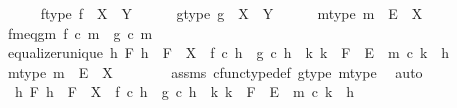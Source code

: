 \begin{isabellebody}
\ \ \ \ \isamarkupfalse%
\ f{\isacharunderscore}{\kern0pt}type{}{\isacharcolon}{\kern0pt}\ {\isachardoublequoteopen}f\ {\isacharcolon}{\kern0pt}\ X{\isacharprime}{\kern0pt}\ {\isasymrightarrow}\ Y{\isacharprime}{\kern0pt}{\isachardoublequoteclose}\isanewline
\ \ \ \ \isamarkupfalse%
\ g{\isacharunderscore}{\kern0pt}type{}{\isacharcolon}{\kern0pt}\ {\isachardoublequoteopen}g\ {\isacharcolon}{\kern0pt}\ X{\isacharprime}{\kern0pt}\ {\isasymrightarrow}\ Y{\isacharprime}{\kern0pt}{\isachardoublequoteclose}\isanewline
\ \ \ \ \isamarkupfalse%
\ m{\isacharunderscore}{\kern0pt}type{\isacharcolon}{\kern0pt}\ {\isachardoublequoteopen}m\ {\isacharcolon}{\kern0pt}\ E\ {\isasymrightarrow}\ X{\isacharprime}{\kern0pt}{\isachardoublequoteclose}\isanewline
\ \ \ \ \isamarkupfalse%
\ fm{\isacharunderscore}{\kern0pt}eq{\isacharunderscore}{\kern0pt}gm{\isacharcolon}{\kern0pt}\ {\isachardoublequoteopen}f\ {\isasymcirc}\isactrlsub c\ m\ {\isacharequal}{\kern0pt}\ g\ {\isasymcirc}\isactrlsub c\ m{\isachardoublequoteclose}\isanewline
\ \ \ \ \isamarkupfalse%
\ equalizer{\isacharunderscore}{\kern0pt}unique{\isacharcolon}{\kern0pt}\ {\isachardoublequoteopen}{\isasymforall}h\ F{\isachardot}{\kern0pt}\ h\ {\isacharcolon}{\kern0pt}\ F\ {\isasymrightarrow}\ X{\isacharprime}{\kern0pt}\ {\isasymand}\ f\ {\isasymcirc}\isactrlsub c\ h\ {\isacharequal}{\kern0pt}\ g\ {\isasymcirc}\isactrlsub c\ h\ {\isasymlongrightarrow}\ {\isacharparenleft}{\kern0pt}{\isasymexists}{\isacharbang}{\kern0pt}k{\isachardot}{\kern0pt}\ k\ {\isacharcolon}{\kern0pt}\ F\ {\isasymrightarrow}\ E\ {\isasymand}\ m\ {\isasymcirc}\isactrlsub c\ k\ {\isacharequal}{\kern0pt}\ h{\isacharparenright}{\kern0pt}{\isachardoublequoteclose}\isanewline
\isanewline
\ \ \ \ \isamarkupfalse%
\ m{\isacharunderscore}{\kern0pt}type{}{\isacharcolon}{\kern0pt}\ {\isachardoublequoteopen}m\ {\isacharcolon}{\kern0pt}\ E\ {\isasymrightarrow}\ X{\isachardoublequoteclose}\isanewline
\ \ \ \ \ \ \isamarkupfalse%
\ assms{\isacharparenleft}{\kern0pt}{}{\isacharparenright}{\kern0pt}\ cfunc{\isacharunderscore}{\kern0pt}type{\isacharunderscore}{\kern0pt}def\ g{\isacharunderscore}{\kern0pt}type{}\ m{\isacharunderscore}{\kern0pt}type\ \isamarkupfalse%
\ auto\isanewline
\isanewline
\ \ \ \ \isamarkupfalse%
\ {\isachardoublequoteopen}{\isasymAnd}\ h\ F{\isachardot}{\kern0pt}\ h\ {\isacharcolon}{\kern0pt}\ F\ {\isasymrightarrow}\ X\ {\isasymLongrightarrow}\ f\ {\isasymcirc}\isactrlsub c\ h\ {\isacharequal}{\kern0pt}\ g\ {\isasymcirc}\isactrlsub c\ h\ {\isasymLongrightarrow}\ {\isasymexists}k{\isachardot}{\kern0pt}\ k\ {\isacharcolon}{\kern0pt}\ F\ {\isasymrightarrow}\ E\ {\isasymand}\ m\ {\isasymcirc}\isactrlsub c\ k\ {\isacharequal}{\kern0pt}\ h{\isachardoublequoteclose}\isanewline

\end{isabellebody}
